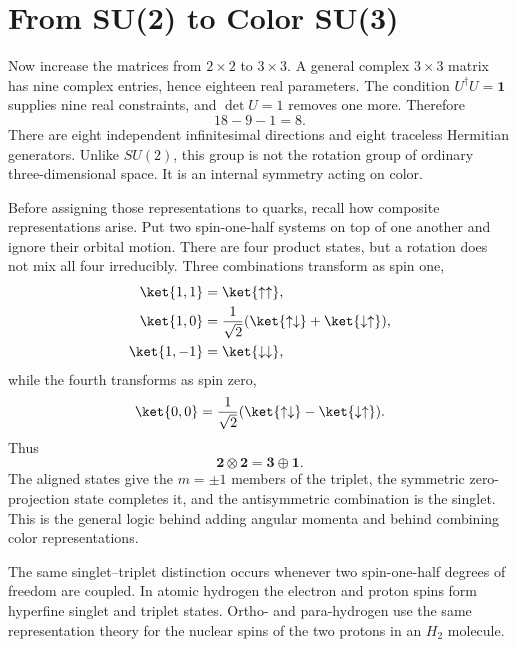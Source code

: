 \section{From SU(2) to Color SU(3)}

Now increase the matrices from \(2\times2\) to \(3\times3\). A general complex
\(3\times3\) matrix has nine complex entries, hence eighteen real parameters.
The condition \(U^\dagger U=\boldsymbol 1\) supplies nine real constraints,
and \(\det U=1\) removes one more. Therefore
\begin{equation}
18-9-1=8.
\end{equation}
There are eight independent infinitesimal directions and eight traceless
Hermitian generators. Unlike \(SU(2)\), this group is not the rotation group
of ordinary three-dimensional space. It is an internal symmetry acting on
color.

Before assigning those representations to quarks, recall how composite
representations arise. Put two spin-one-half systems on top of one another and
ignore their orbital motion. There are four product states, but a rotation does
not mix all four irreducibly. Three combinations transform as spin one,
\begin{align}
\ket{1,1}&=\ket{\uparrow\uparrow},\\
\ket{1,0}&=\frac{1}{\sqrt2}
(\ket{\uparrow\downarrow}+\ket{\downarrow\uparrow}),\\
\ket{1,-1}&=\ket{\downarrow\downarrow},
\end{align}
while the fourth transforms as spin zero,
\begin{equation}
\ket{0,0}=\frac{1}{\sqrt2}
(\ket{\uparrow\downarrow}-\ket{\downarrow\uparrow}).
\end{equation}
Thus
\begin{equation}
\boldsymbol 2\otimes\boldsymbol 2
=\boldsymbol 3\oplus\boldsymbol 1.
\label{eq:l4-two-spin-decomposition}
\end{equation}
The aligned states give the \(m=\pm1\) members of the triplet, the symmetric
zero-projection state completes it, and the antisymmetric combination is the
singlet. This is the general logic behind adding angular momenta and behind
combining color representations.

The same singlet--triplet distinction occurs whenever two spin-one-half
degrees of freedom are coupled. In atomic hydrogen the electron and proton
spins form hyperfine singlet and triplet states. Ortho- and para-hydrogen use
the same representation theory for the nuclear spins of the two protons in an
\(H_2\) molecule.

